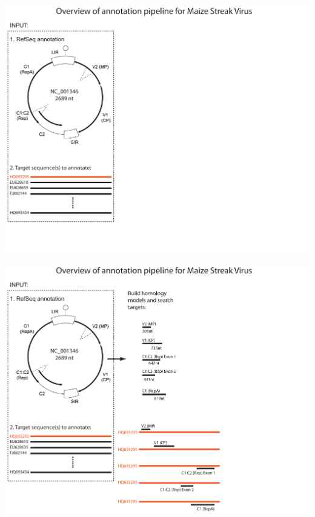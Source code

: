 \documentclass[landscape]{slides}
\begin{document}
\begin{slide}
\begin{center}
\includegraphics[width=10in]{figs/annotation-schematic-msv-1}
\end{center}
\vfill
\end{slide}
\begin{slide}
\begin{center}
\includegraphics[width=10in]{figs/annotation-schematic-msv-2}
\end{center}
\vfill
\end{slide}
\end{document}
